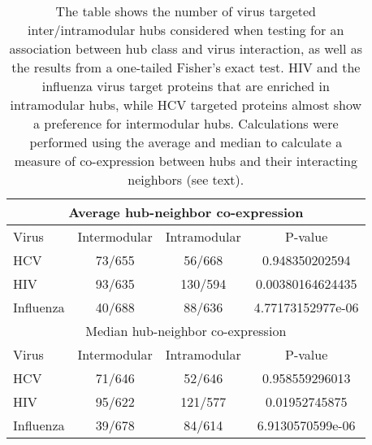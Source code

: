 \begin{table}\footnotesize
\begin{center}
\begin{tabular}{|l|c|c|c|}
\hline
\multicolumn{4}{|c|}{Average hub-neighbor co-expression}\\
\hline
Virus & Intermodular & Intramodular & P-value \\
\hline
HCV &        73/655 &  56/668 &  0.948350202594 \\
HIV &       93/635 & 130/594& 0.00380164624435 \\
Influenza & 40/688 & 88/636 &  4.77173152977e-06 \\
\hline
\hline
\multicolumn{4}{|c|}{Median hub-neighbor co-expression}\\
\hline
Virus & Intermodular & Intramodular & P-value \\
\hline
HCV &        71/646  & 52/646  & 0.958559296013\\
HIV & 95/622  & 121/577 & 0.01952745875\\
Influenza & 39/678  & 84/614  & 6.9130570599e-06\\
\hline
  \end{tabular}
\end{center}
\caption[Fisher's test for virus hub preference]{\small The table
  shows the number of virus targeted inter/intramodular hubs
  considered when testing for an association between hub class and
  virus interaction, as well as the results from a one-tailed Fisher's
  exact test. HIV and the influenza virus target proteins that are
  enriched in intramodular hubs, while HCV targeted proteins almost
  show a preference for intermodular hubs. Calculations were performed
  using the average and median to calculate a measure of co-expression
  between hubs and their interacting neighbors (see
  text). \label{tbl:sysBio:bindingFisher}}
\end{table}
